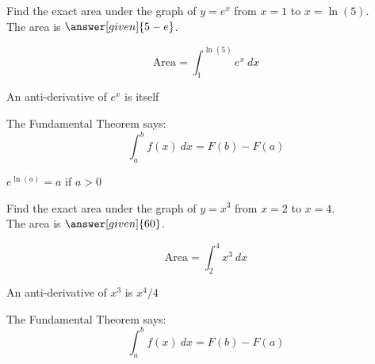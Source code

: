 \documentclass{ximera}
\begin{document}
\begin{problem} %
 Find the exact area under the graph of $y = e^x$ from $x=1$ to $x = \ln(5)$.\\
The area is $\answer[given]{5-e}$.
 \begin{hint}
 \[
 \text{Area} = \int_1^{\ln(5)} e^x \ dx 
  \]
  \end{hint}
    \begin{hint}
      An anti-derivative of $e^x$ is itself
    \end{hint}
    
    \begin{hint}
      The Fundamental Theorem says:
      \[
      \int_a^b f(x) \ dx = F(b) - F(a)
      \]
    \end{hint}   
		\begin{hint}
      $e^{\ln(a)} = a$ if $a > 0$
    \end{hint}
\end{problem}




\begin{problem} %
Find the exact area under the graph of $y = x^3$ from $x = 2$ to $x = 4$.\\
The area is $\answer[given]{60}$.
 \begin{hint}
 \[
  \text{Area}=\int_2^{4} x^3 \ dx
  \]
  \end{hint}
    \begin{hint}
      An anti-derivative of $x^3$ is $x^4 /4$
    \end{hint}
    \begin{hint}
      The Fundamental Theorem says:
      \[
      \int_a^b f(x) \ dx = F(b) - F(a)
      \]
    \end{hint}    
		
		
\end{problem}
\end{document}
